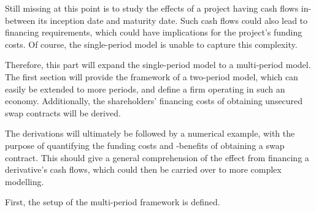\documentclass[main.tex]{subfiles}
\begin{document}
    Still missing at this point is to study the effects of a project
    having cash flows in-between its inception date and maturity date.
    Such cash flows could also lead to financing requirements,
    which could have implications for the project's funding costs.
    Of course, the single-period model is unable to capture this complexity.

    Therefore, this part will expand the single-period model to a multi-period model.
    The first section will provide the framework of a two-period model, 
    which can easily be extended to more periods,
    and define a firm operating in such an economy.
    Additionally, the shareholders' financing costs 
    of obtaining unsecured swap contracts will be derived.

    The derivations will ultimately be followed by a numerical example,
    with the purpose of quantifying the funding costs and -benefits of obtaining a swap contract.
    This should give a general comprehension of the effect from financing a derivative's cash flows,
    which could then be carried over to more complex modelling.

    First, the setup of the multi-period framework is defined.
\end{document}
